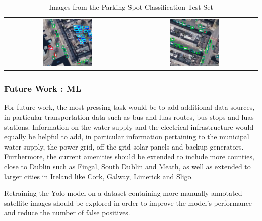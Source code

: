 \begin{table}[htbp]
\begin{tabular}{cc}
        \includegraphics[width=0.4\textwidth]{images/image5_classification_test_set.png} & \includegraphics[width=0.4\textwidth]{images/image6_classification_test_set.png} \\
    \end{tabular}
    \caption{Images from the Parking Spot Classification Test Set}
    \label{tab:test_images3}
\end{table}

\newpage{}

\subsubsection{Future Work : ML}

For future work, the most pressing task would be to add additional data sources, in particular transportation data such as bus and luas routes, bus stops and luas stations.
Information on the water supply and the electrical infrastructure would equally be helpful to add, in particular information pertaining to the municipal water supply, the power grid, off the grid solar panels and backup generators.\\
Furthermore, the current amenities should be extended to include more counties, close to Dublin such as Fingal, South Dublin and Meath, as well as extended to larger cities in Ireland like Cork, Galway, Limerick and Sligo.

Retraining the Yolo model on a dataset containing more manually annotated satellite images should be explored in order to improve the model's performance and reduce the number of false positives.

